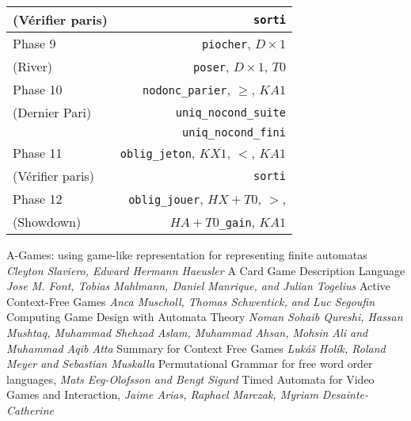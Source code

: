 \documentclass{cours}
\begin{document}
\begin{table}
\begin{tabular}{lr}
        (Vérifier paris) & \texttt{sorti}\\
        \midrule
        Phase 9 & \texttt{piocher}, $D \times 1$\\
        (River) & \texttt{poser}, $D\times 1$, $T0$\\
        \midrule
        Phase 10 & \texttt{nodonc\_parier}, $\geq$, $KA1$\\
        (Dernier Pari) & \texttt{uniq\_nocond\_suite}\\
        & \texttt{uniq\_nocond\_fini}\\
        \midrule
        Phase 11 & \texttt{oblig\_jeton}, $KX1$, $<$, $KA1$\\
        (Vérifier paris) & \texttt{sorti}\\
        \midrule
        Phase 12 & \texttt{oblig\_jouer}, $HX + T0$, $>$,\\
        (Showdown) & $HA + T0$\texttt{\_gain}, $KA1$\\
        \bottomrule
    \end{tabular}
\end{table}

\newpage
\begin{thebibliography}{5}
     A-Games: using game-like representation for representing finite automatas \textit{Cleyton Slaviero, Edward Hermann Haeusler}
     A Card Game Description Language \textit{Jose M. Font, Tobias Mahlmann, Daniel Manrique, and Julian Togelius}
     Active Context-Free Games \textit{Anca Muscholl, Thomas Schwentick, and Luc Segoufin}
     Computing Game Design with Automata Theory \textit{Noman Sohaib Qureshi, Hassan Mushtaq, Muhammad Shehzad Aslam, Muhammad Ahsan, Mohsin Ali and Muhammad Aqib Atta}
     Summary for Context Free Games \textit{Lukáš Holík, Roland Meyer and Sebastian Muskalla}
     Permutational Grammar for free word order languages, \textit{Mats Eeg-Olofsson and Bengt Sigurd}
     Timed Automata for Video Games and Interaction, \textit{Jaime Arias, Raphael Marczak, Myriam Desainte-Catherine}
\end{thebibliography}
\end{document}
